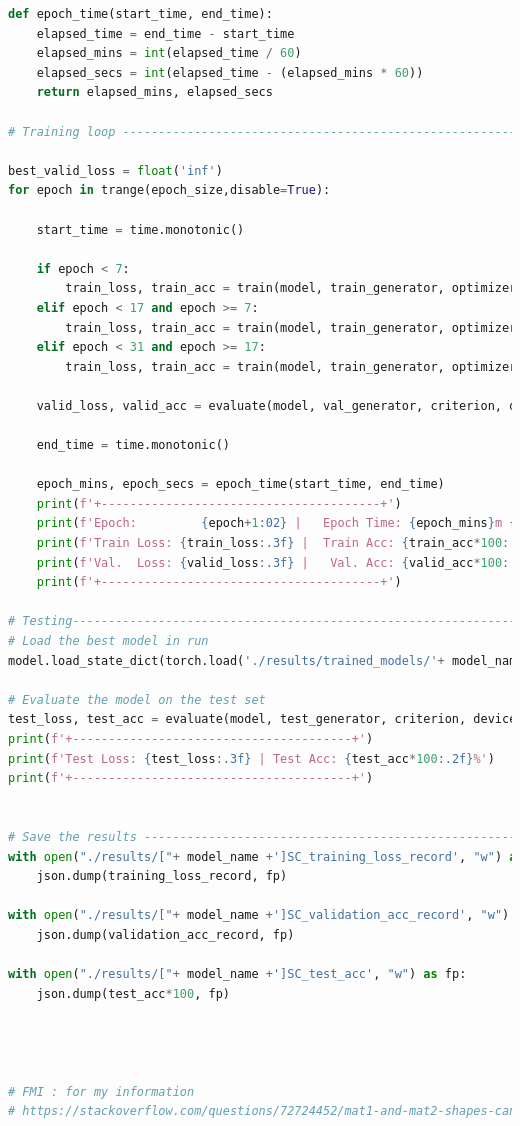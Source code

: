 \documentclass[3p,times,procedia]{elsarticle}
\begin{document}
\begin{lstlisting}[language=Python]
def epoch_time(start_time, end_time):
    elapsed_time = end_time - start_time
    elapsed_mins = int(elapsed_time / 60)
    elapsed_secs = int(elapsed_time - (elapsed_mins * 60))
    return elapsed_mins, elapsed_secs

# Training loop ---------------------------------------------------------------------------------------------------------------------------------------#

best_valid_loss = float('inf')
for epoch in trange(epoch_size,disable=True):

    start_time = time.monotonic()

    if epoch < 7:
        train_loss, train_acc = train(model, train_generator, optimizer1, criterion, device)
    elif epoch < 17 and epoch >= 7:
        train_loss, train_acc = train(model, train_generator, optimizer2, criterion, device)
    elif epoch < 31 and epoch >= 17:
        train_loss, train_acc = train(model, train_generator, optimizer3, criterion, device)
        
    valid_loss, valid_acc = evaluate(model, val_generator, criterion, device, sv=0)

    end_time = time.monotonic()

    epoch_mins, epoch_secs = epoch_time(start_time, end_time)
    print(f'+---------------------------------------+')
    print(f'Epoch:         {epoch+1:02} |   Epoch Time: {epoch_mins}m {epoch_secs}s')
    print(f'Train Loss: {train_loss:.3f} |  Train Acc: {train_acc*100:.2f} %')
    print(f'Val.  Loss: {valid_loss:.3f} |   Val. Acc: {valid_acc*100:.2f} %')
    print(f'+---------------------------------------+')

# Testing-----------------------------------------------------------------------------------------------------------------------------------------------#
# Load the best model in run
model.load_state_dict(torch.load('./results/trained_models/'+ model_name+'[scheduled].pt'))

# Evaluate the model on the test set
test_loss, test_acc = evaluate(model, test_generator, criterion, device, sv=0)
print(f'+---------------------------------------+')
print(f'Test Loss: {test_loss:.3f} | Test Acc: {test_acc*100:.2f}%')
print(f'+---------------------------------------+')


# Save the results ----------------------------------------------------------------------------------------------------------------------------------#
with open("./results/["+ model_name +']SC_training_loss_record', "w") as fp:
    json.dump(training_loss_record, fp)

with open("./results/["+ model_name +']SC_validation_acc_record', "w") as fp:
    json.dump(validation_acc_record, fp)

with open("./results/["+ model_name +']SC_test_acc', "w") as fp:
    json.dump(test_acc*100, fp)




# FMI : for my information
# https://stackoverflow.com/questions/72724452/mat1-and-mat2-shapes-cannot-be-multiplied-128x4-and-128x64

\end{lstlisting}
\end{document}
